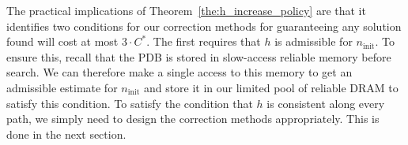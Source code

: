 \documentclass[letterpaper]{article}
\begin{document}
%
%
%




The practical implications of Theorem~\ref{the:h_increase_policy} are that it identifies two conditions for our correction methods for guaranteeing any solution found will cost at most $3 \cdot C^*$. The first requires that $h$ is admissible for $n_{\mathrm{init}}$. To ensure this, recall that the PDB is stored in slow-access reliable memory before search.
We can therefore make a single access to this memory to get an admissible estimate for $n_{\mathrm{init}}$ and store it in our limited pool of reliable DRAM to satisfy this condition.
To satisfy the condition that $h$ is consistent along every path, we simply need to design the correction methods appropriately. This is done in the next section.
\end{document}
